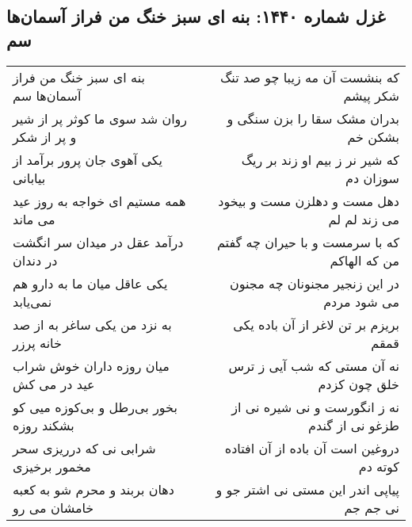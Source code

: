 \begin{center}
\section*{غزل شماره ۱۴۴۰: بنه ای سبز خنگ من فراز آسمان‌ها سم}
\label{sec:1440}
\begin{longtable}{l p{0.5cm} r}
بنه ای سبز خنگ من فراز آسمان‌ها سم
&&
که بنشست آن مه زیبا چو صد تنگ شکر پیشم
\\
روان شد سوی ما کوثر پر از شیر و پر از شکر
&&
بدران مشک سقا را بزن سنگی و بشکن خم
\\
یکی آهوی جان پرور برآمد از بیابانی
&&
که شیر نر ز بیم او زند بر ریگ سوزان دم
\\
همه مستیم ای خواجه به روز عید می ماند
&&
دهل مست و دهلزن مست و بیخود می زند لم لم
\\
درآمد عقل در میدان سر انگشت در دندان
&&
که با سرمست و با حیران چه گفتم من که الهاکم
\\
یکی عاقل میان ما به دارو هم نمی‌یابد
&&
در این زنجیر مجنونان چه مجنون می شود مردم
\\
به نزد من یکی ساغر به از صد خانه پرزر
&&
بریزم بر تن لاغر از آن باده یکی قمقم
\\
میان روزه داران خوش شراب عید در می کش
&&
نه آن مستی که شب آیی ز ترس خلق چون کزدم
\\
بخور بی‌رطل و بی‌کوزه میی کو بشکند روزه
&&
نه ز انگورست و نی شیره نی از طزغو نی از گندم
\\
شرابی نی که درریزی سحر مخمور برخیزی
&&
دروغین است آن باده از آن افتاده کوته دم
\\
دهان بربند و محرم شو به کعبه خامشان می رو
&&
پیاپی اندر این مستی نی اشتر جو و نی جم جم
\\
\end{longtable}
\end{center}
